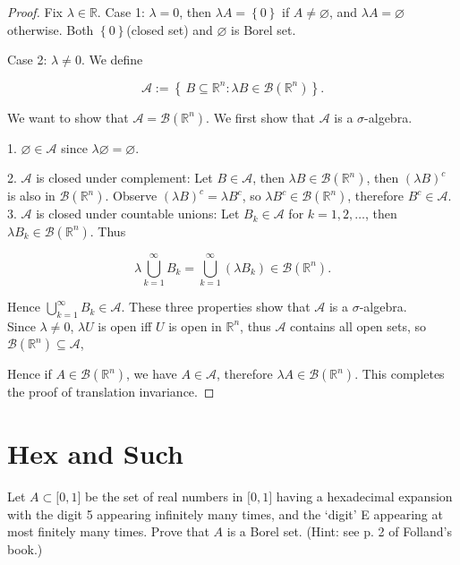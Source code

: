 \begin{proof}

Fix \(\lambda \in \mathbb{R}\). Case 1: \(\lambda = 0\), then \(\lambda A = \left\{ 0 \right\}\) if \(A \neq \varnothing\), and \(\lambda A = \varnothing\) otherwise. Both \(\left\{ 0 \right\}\)(closed set) and \(\varnothing\) is Borel set.

Case 2: \(\lambda \neq 0\). We define

\[\mathcal{A} := \left\{ {\, B \subseteq \mathbb{R}^{n}:\lambda B \in \mathcal{B}(\mathbb{R}^{n})} \right\}.\]

We want to show that \(\mathcal{A} = \mathcal{B}(\mathbb{R}^{n})\). We first show that \(\mathcal{A}\) is a \(\sigma\)-algebra.

1. \(\varnothing \in \mathcal{A}\) since \(\lambda\varnothing = \varnothing\).

2. \(\mathcal{A}\) is closed under complement: Let \(B \in \mathcal{A}\), then \(\lambda B \in \mathcal{B}(\mathbb{R}^{n})\), then \((\lambda B)^{c}\) is also in \(\mathcal{B}(\mathbb{R}^{n})\). Observe \((\lambda B)^{c} = \lambda B^{c}\), so \(\lambda B^{c} \in \mathcal{B}(\mathbb{R}^{n})\), therefore \(B^{c} \in \mathcal{A}\). 3. \(\mathcal{A}\) is closed under countable unions: Let \(B_{k} \in \mathcal{A}\) for \(k = 1,2,\ldots\), then \(\lambda B_{k} \in \mathcal{B}(\mathbb{R}^{n})\). Thus

\[\lambda\bigcup\limits_{k = 1}^{\infty}B_{k} = \bigcup\limits_{k = 1}^{\infty}(\lambda B_{k}) \in \mathcal{B}(\mathbb{R}^{n}).\]

Hence \(\bigcup_{k = 1}^{\infty}B_{k} \in \mathcal{A}\). These three properties show that \(\mathcal{A}\) is a \(\sigma\)-algebra.\\
Since \(\lambda \neq 0\), \(\lambda U\) is open iff \(U\) is open in \(\mathbb{R}^{n}\), thus \(\mathcal{A}\) contains all open sets, so \(\mathcal{B}(\mathbb{R}^{n}) \subseteq \mathcal{A}\),

Hence if \(A \in \mathcal{B}(\mathbb{R}^{n})\), we have \(A \in \mathcal{A}\), therefore \(\lambda A \in \mathcal{B}(\mathbb{R}^{n})\). This completes the proof of translation invariance.

\end{proof}

\section{Hex and Such}\label{hex-and-such}

Let \(A \subset \lbrack 0,1\rbrack\) be the set of real numbers in \(\lbrack 0,1\rbrack\) having a hexadecimal expansion with the digit 5 appearing infinitely many times, and the `digit' E appearing at most finitely many times. Prove that \(A\) is a Borel set. (Hint: see p. 2 of Folland's book.)

